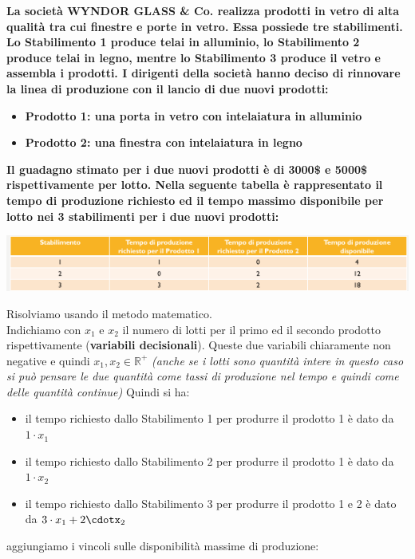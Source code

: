 \message{ !name(ro.tex)}\documentclass[a4paper,12pt, oneside]{book}
\begin{document}
\begin{esempio}
  \textbf{La società WYNDOR GLASS & Co. realizza prodotti in vetro di
    alta qualità tra cui finestre e porte in vetro. Essa possiede tre
    stabilimenti. Lo Stabilimento 1 produce telai in alluminio, lo
    Stabilimento 2 produce telai in legno, mentre lo Stabilimento 3
    produce il vetro e assembla i prodotti. I dirigenti della società
    hanno deciso di rinnovare la linea di produzione con il lancio di
    due nuovi prodotti:}
  \begin{itemize}
    \item \textbf{Prodotto 1: una porta in vetro con intelaiatura in
      alluminio}
    \item \textbf{Prodotto 2: una finestra con intelaiatura in legno}
  \end{itemize}
  \textbf{Il guadagno stimato per i due nuovi prodotti è di 3000\$ e
    5000\$ rispettivamente per lotto. Nella seguente tabella è
    rappresentato il tempo di produzione richiesto ed il tempo massimo
    disponibile per lotto nei 3 stabilimenti per i due nuovi
    prodotti:}
  \begin{center}
    \includegraphics[scale = 0.7]{img/3d6.png}
  \end{center}
  Risolviamo usando il metodo matematico.\\
  Indichiamo con $x_1$ e $x_2$ il numero di lotti per il primo ed il
  secondo prodotto rispettivamente (\textbf{variabili
    decisionali}). Queste due variabili chiaramente non negative e
  quindi $x_1,x_2\in \mathbb{R}^+$ \textit{(anche se i lotti sono
    quantità intere in questo caso si può pensare le due quantità
    come tassi di produzione nel tempo e quindi come delle quantità
    continue)}
  Quindi si ha:
  \begin{itemize}
    \item il tempo richiesto dallo Stabilimento 1 per produrre il
    prodotto 1 è dato da $1\cdot x_1$
    \item il tempo richiesto dallo Stabilimento 2 per produrre il
    prodotto 1 è dato da $1\cdot x_2$
    \item il tempo richiesto dallo Stabilimento 3 per produrre il
    prodotto 1 e 2 è dato da $3\cdot x_1+2\cdotx_2$
  \end{itemize}
  aggiungiamo i vincoli sulle disponibilità massime di produzione:

\end{esempio}
\end{document}
